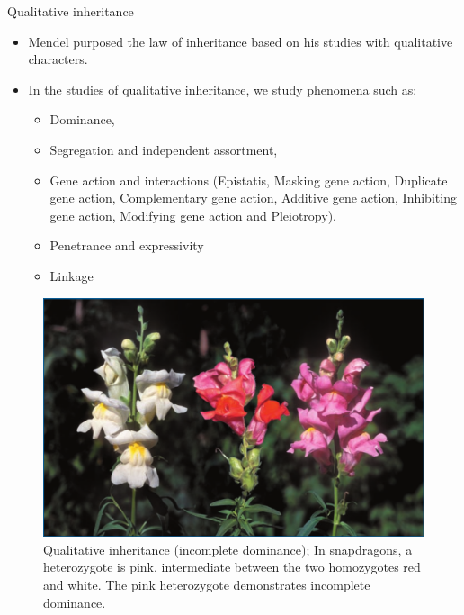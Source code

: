 \documentclass[11pt,ignorenonframetext,aspectratio=169]{beamer}
\providecommand{\tightlist}{%
  \setlength{\itemsep}{0pt}\setlength{\parskip}{0pt}}
\begin{document}
\begin{frame}{Qualitative inheritance}
\protect\hypertarget{qualitative-inheritance}{}
\begin{itemize}
\tightlist
\item
  Mendel purposed the law of inheritance based on his studies with
  qualitative characters.
\item
  In the studies of qualitative inheritance, we study phenomena such as:

  \begin{itemize}
  \footnotesize
  \item Dominance, 
  \item Segregation  and independent assortment, 
  \item Gene action and interactions (Epistatis, Masking gene action, Duplicate gene action, Complementary gene action, Additive gene action, Inhibiting gene action, Modifying gene action and Pleiotropy).
  \item Penetrance and expressivity
  \item Linkage
  \end{itemize}
\end{itemize}

\begin{figure}

{\centering \includegraphics[width=0.38\linewidth]{./images/incomplete_dominance} 

}

\caption{Qualitative inheritance (incomplete dominance); In snapdragons, a heterozygote is pink, intermediate between the two homozygotes red and white. The pink heterozygote demonstrates incomplete dominance.}\label{fig:incomplete-dominance}
\end{figure}
\end{frame}
\end{document}
